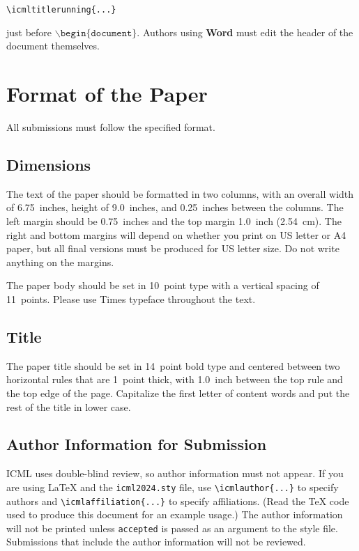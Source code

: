 \documentclass{article}
\theoremstyle{plain}
\theoremstyle{definition}
\theoremstyle{remark}
\begin{document}
\verb|\icmltitlerunning{...}|

just before $\mathtt{\backslash begin\{document\}}$.
Authors using \textbf{Word} must edit the header of the document themselves.

\section{Format of the Paper}

All submissions must follow the specified format.

\subsection{Dimensions}




The text of the paper should be formatted in two columns, with an
overall width of 6.75~inches, height of 9.0~inches, and 0.25~inches
between the columns. The left margin should be 0.75~inches and the top
margin 1.0~inch (2.54~cm). The right and bottom margins will depend on
whether you print on US letter or A4 paper, but all final versions
must be produced for US letter size.
Do not write anything on the margins.

The paper body should be set in 10~point type with a vertical spacing
of 11~points. Please use Times typeface throughout the text.

\subsection{Title}

The paper title should be set in 14~point bold type and centered
between two horizontal rules that are 1~point thick, with 1.0~inch
between the top rule and the top edge of the page. Capitalize the
first letter of content words and put the rest of the title in lower
case.

\subsection{Author Information for Submission}
\label{author info}

ICML uses double-blind review, so author information must not appear. If
you are using \LaTeX\/ and the \texttt{icml2024.sty} file, use
\verb+\icmlauthor{...}+ to specify authors and \verb+\icmlaffiliation{...}+ to specify affiliations. (Read the TeX code used to produce this document for an example usage.) The author information
will not be printed unless \texttt{accepted} is passed as an argument to the
style file.
Submissions that include the author information will not
be reviewed.
\end{document}
